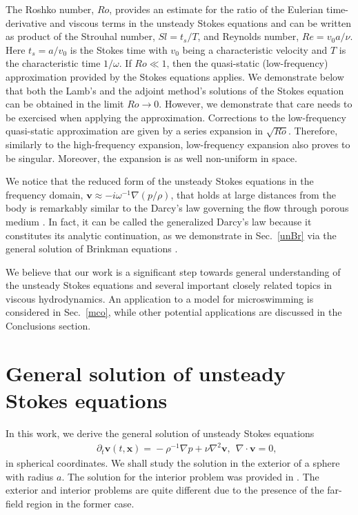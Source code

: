 \documentclass[aps,prx,twocolumn,amsmath,amssymb,amsfonts]{revtex4-2}
\begin{document}
The Roshko number, $Ro$, provides an estimate for the ratio of the Eulerian time-derivative and viscous terms in the unsteady Stokes equations and can be written as product of the Strouhal number, $Sl=t_s/T$, and Reynolds number, $Re\!=\!v_0 a/\nu$. Here $t_s=a/v_0$ is the Stokes time with $v_0$ being a characteristic velocity and $T$ is the characteristic time $1/\omega$. If $Ro\!\ll\!1$, then the quasi-static (low-frequency) approximation provided by the Stokes equations applies. We demonstrate below that both the Lamb's and the adjoint method's solutions of the Stokes equation can be obtained in the limit
$Ro\! \to\! 0$. However, we demonstrate that care needs to be exercised when applying the approximation. Corrections to the low-frequency quasi-static approximation are given by a series expansion in $\sqrt{Ro}$. Therefore, similarly to the high-frequency expansion, low-frequency expansion also proves to be singular. Moreover, the expansion is as well non-uniform in space.


We notice that the reduced form of the unsteady Stokes equations in the frequency domain, $\bm v\approx -i\omega^{-1} \nabla (p/\rho)$, that holds at large distances from the body is remarkably similar to the Darcy's law governing the flow through porous medium \cite{r}. In fact, it can be called the generalized Darcy's law because it constitutes its analytic continuation, as we demonstrate in Sec.~\ref{unBr} via the general solution of Brinkman equations \cite{r,dru}.

We believe that our work is a significant step towards general understanding of the unsteady Stokes equations and several important closely related topics in viscous hydrodynamics. An application to a model for microswimming is considered in Sec.~\ref{mco}, while other potential applications are discussed in the Conclusions section.

\section{General solution of unsteady Stokes equations} \label{st}

In this work, we derive the general solution of unsteady Stokes equations
\begin{eqnarray}&&\!\!\!\!\!\!\!\!\!\!\!\!\!
\partial_t \bm v(t, \bm x)\!=\!-\rho^{-1}\nabla p\!+\!\nu \nabla^2\bm v,\ \ \nabla\cdot\bm v\!=\!0, \label{unsad}
\end{eqnarray}
in spherical coordinates. We shall study the solution in the exterior of a sphere with radius $a$. The solution for the interior problem was provided in \cite{inter}.  The exterior and interior problems are quite different due to the presence of the far-field region in the former case.
\end{document}
